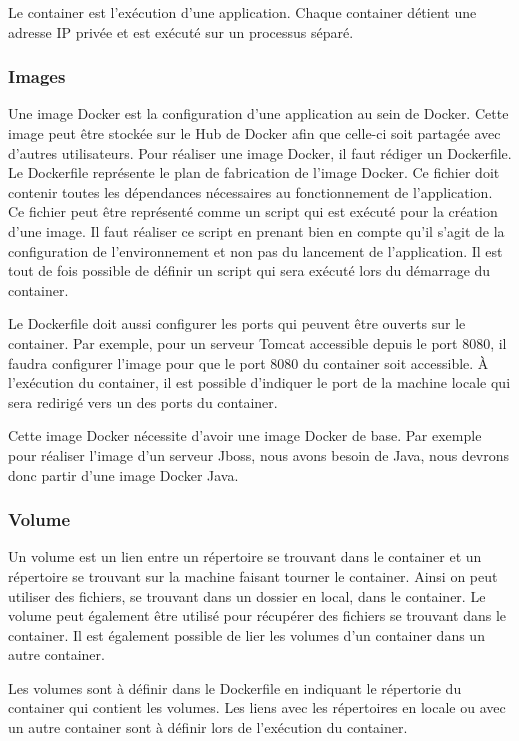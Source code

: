 Le container est l’exécution d'une application. Chaque container détient une adresse IP privée et est exécuté sur un processus séparé.


\subsubsection{Images}

Une image Docker est la configuration d'une application au sein de Docker. Cette image peut être stockée sur le Hub de Docker afin que celle-ci soit partagée avec d'autres utilisateurs. Pour réaliser une image Docker, il faut rédiger un Dockerfile. Le Dockerfile représente le plan de fabrication de l'image Docker. Ce fichier doit contenir toutes les dépendances nécessaires au fonctionnement de l'application. Ce fichier peut être représenté comme un script qui est exécuté pour la création d'une image. Il faut réaliser ce script en prenant bien en compte qu'il s'agit de la configuration de l'environnement et non pas du lancement de l'application. Il est tout de fois possible de définir un script qui sera exécuté lors du démarrage du container.

Le Dockerfile doit aussi configurer les ports qui peuvent être ouverts sur le container. Par exemple, pour un serveur Tomcat accessible depuis le port 8080, il faudra configurer l'image pour que le port 8080 du container soit accessible. À l'exécution du container, il est possible d'indiquer le port de la machine locale qui sera redirigé vers un des ports du container.

Cette image Docker nécessite d'avoir une image Docker de base. Par exemple pour réaliser l'image d'un serveur Jboss, nous avons besoin de Java, nous devrons donc partir d'une image Docker Java.


\subsubsection{Volume}

Un volume est un lien entre un répertoire se trouvant dans le container et un répertoire se trouvant sur la machine faisant tourner le container. Ainsi on peut utiliser des fichiers, se trouvant dans un dossier en local, dans le container. Le volume peut également être utilisé pour récupérer des fichiers se trouvant dans le container. Il est également possible de lier les volumes d'un container dans un autre container.

Les volumes sont à définir dans le Dockerfile en indiquant le répertorie du container qui contient les volumes. Les liens avec les répertoires en locale ou avec un autre container sont à définir lors de l'exécution du container.

